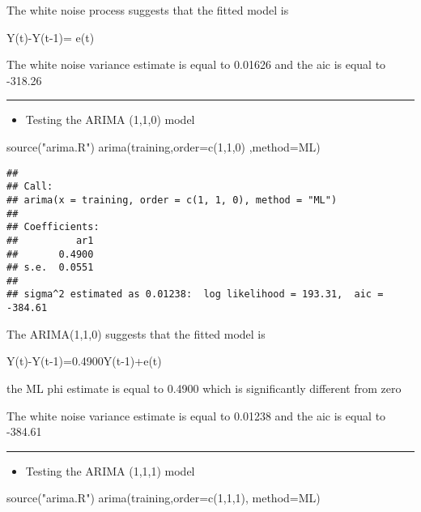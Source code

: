 \documentclass[
]{article}
\newenvironment{Shaded}{\begin{snugshade}}{\end{snugshade}}
\newcommand{\AttributeTok}[1]{\textcolor[rgb]{0.77,0.63,0.00}{#1}}
\newcommand{\DecValTok}[1]{\textcolor[rgb]{0.00,0.00,0.81}{#1}}
\newcommand{\FunctionTok}[1]{\textcolor[rgb]{0.00,0.00,0.00}{#1}}
\newcommand{\NormalTok}[1]{#1}
\newcommand{\StringTok}[1]{\textcolor[rgb]{0.31,0.60,0.02}{#1}}
\providecommand{\tightlist}{%
  \setlength{\itemsep}{0pt}\setlength{\parskip}{0pt}}
\begin{document}
The white noise process suggests that the fitted model is

Y(t)-Y(t-1)= e(t)

The white noise variance estimate is equal to 0.01626 and the aic is
equal to -318.26

\begin{center}\rule{0.5\linewidth}{0.5pt}\end{center}

\begin{itemize}
\tightlist
\item
  Testing the ARIMA (1,1,0) model
\end{itemize}

\begin{Shaded}
\begin{Highlighting}[]
\FunctionTok{source}\NormalTok{(}\StringTok{"arima.R"}\NormalTok{) }
\FunctionTok{arima}\NormalTok{(training,}\AttributeTok{order=}\FunctionTok{c}\NormalTok{(}\DecValTok{1}\NormalTok{,}\DecValTok{1}\NormalTok{,}\DecValTok{0}\NormalTok{) ,}\AttributeTok{method=}\StringTok{\textquotesingle{}ML\textquotesingle{}}\NormalTok{)}
\end{Highlighting}
\end{Shaded}

\begin{verbatim}
## 
## Call:
## arima(x = training, order = c(1, 1, 0), method = "ML")
## 
## Coefficients:
##          ar1
##       0.4900
## s.e.  0.0551
## 
## sigma^2 estimated as 0.01238:  log likelihood = 193.31,  aic = -384.61
\end{verbatim}

The ARIMA(1,1,0) suggests that the fitted model is

Y(t)-Y(t-1)=0.4900Y(t-1)+e(t)

the ML phi estimate is equal to 0.4900 which is significantly different
from zero

The white noise variance estimate is equal to 0.01238 and the aic is
equal to -384.61

\begin{center}\rule{0.5\linewidth}{0.5pt}\end{center}

\begin{itemize}
\tightlist
\item
  Testing the ARIMA (1,1,1) model
\end{itemize}

\begin{Shaded}
\begin{Highlighting}[]
\FunctionTok{source}\NormalTok{(}\StringTok{"arima.R"}\NormalTok{) }
\FunctionTok{arima}\NormalTok{(training,}\AttributeTok{order=}\FunctionTok{c}\NormalTok{(}\DecValTok{1}\NormalTok{,}\DecValTok{1}\NormalTok{,}\DecValTok{1}\NormalTok{), }\AttributeTok{method=}\StringTok{\textquotesingle{}ML\textquotesingle{}}\NormalTok{)}
\end{Highlighting}
\end{Shaded}
\end{document}
